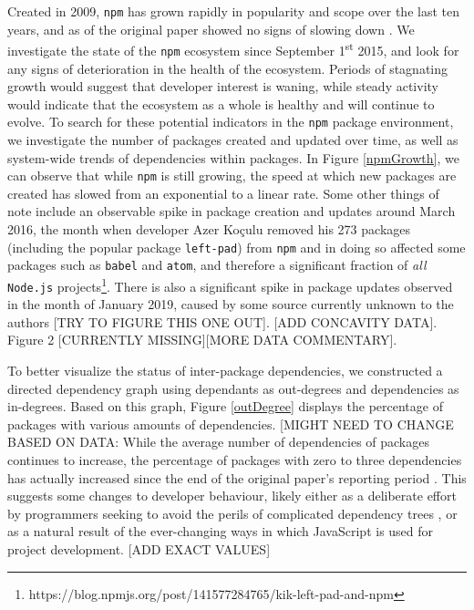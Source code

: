 \documentclass[10pt,conference]{IEEEtran}
\def\code#1{\texttt{#1}}
\begin{document}
Created in 2009, \code{npm} has grown
rapidly in popularity and scope over the last ten years, and 
as of the original paper showed no signs of slowing down \cite{Wittern:2016}.
We investigate the state of the \code{npm} ecosystem
since September 1\textsuperscript{st} 2015, and look for any signs of deterioration in 
the health of the ecosystem. Periods of stagnating growth would suggest
that developer interest is waning, while steady activity would 
indicate that the ecosystem as a whole is healthy and will continue to
evolve. To search for these potential indicators in the \code{npm} package environment,
we investigate the number of packages created and updated over time, as well
as system-wide trends of dependencies within packages. In Figure \ref{npmGrowth},
we can observe that while \code{npm} is still growing, the speed at which new packages
are created has slowed from an exponential to a linear rate. Some other things of note 
include an observable spike in package creation and updates around March 2016, the month 
when developer Azer Ko\c{c}ulu removed his 273 packages (including the popular package 
\code{left-pad}) from \code{npm} and in doing so affected some packages such as 
\code{babel} and \code{atom}, and therefore a significant fraction of \emph{all} 
\code{Node.js} projects\footnote{https://blog.npmjs.org/post/141577284765/kik-left-pad-and-npm}.
There is also a significant spike in package updates observed in the month of January 2019, caused 
by some source currently unknown to the authors [TRY TO FIGURE THIS ONE OUT].
[ADD CONCAVITY DATA]. Figure 2 [CURRENTLY MISSING][MORE DATA COMMENTARY].

To better visualize the status of inter-package dependencies, we constructed
a directed dependency graph using dependants as out-degrees and
dependencies as in-degrees. Based on this graph, Figure \ref{outDegree}
displays the percentage of packages with various amounts of dependencies. 
[MIGHT NEED TO CHANGE BASED ON DATA: While the average number of dependencies 
of packages continues to increase, the percentage of packages with zero 
to three dependencies has actually increased since the end of the original paper's
reporting period \cite{Wittern:2016}. This suggests some changes to developer 
behaviour, likely either as a deliberate effort by programmers seeking to avoid the perils of 
complicated dependency trees \cite{Kikas:2017}, or as a natural result of the ever-changing
ways in which JavaScript is used for project development. [ADD EXACT VALUES]
\end{document}
